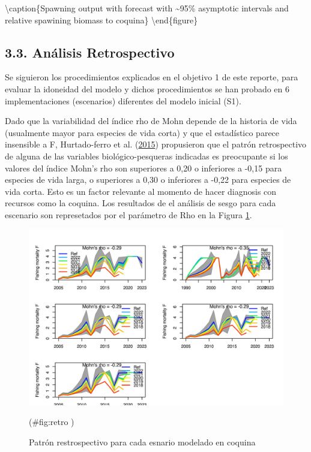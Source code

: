 \documentclass[
]{article}
\begin{document}
\textbackslash caption\{\label{fig:ssb}Spawning output with forecast with \textasciitilde95\% asymptotic intervals and relative spawining biomass to coquina\}\label{fig:ssb-2}
\textbackslash end\{figure\}

\hypertarget{anuxe1lisis-retrospectivo}{%
\subsection{3.3. Análisis Retrospectivo}\label{anuxe1lisis-retrospectivo}}

Se siguieron los procedimientos explicados en el objetivo 1 de este reporte, para evaluar la idoneidad
del modelo y dichos procedimientos se han probado en 6 implementaciones (escenarios) diferentes del
modelo inicial (S1).

Dado que la variabilidad del índice rho de Mohn depende de la historia de vida (usualmente
mayor para especies de vida corta) y que el estadístico parece insensible a F, Hurtado-ferro et al. (\protect\hyperlink{ref-Hurtado2014}{2015})
propusieron que el patrón retrospectivo de alguna de las variables biológico-pesqueras indicadas es
preocupante si los valores del índice Mohn's rho son superiores a 0,20 o inferiores a -0,15 para especies
de vida larga, o superiores a 0,30 o inferiores a -0,22 para especies de vida corta. Esto es un factor relevante al momento de hacer diagnosis con recursos como la coquina. Los resultados de el análisis de sesgo para cada escenario son represetados por el parámetro de Rho en la Figura \ref{fig:retro}.

\begin{figure}[H]

{\centering \includegraphics{Dtrunculus_SS3_2024_files/figure-latex/retro -1} 

}

\caption{\label{fig:retro}Patrón restrospectivo para cada esnario modelado en coquina}(\#fig:retro )
\end{figure}
\end{document}
